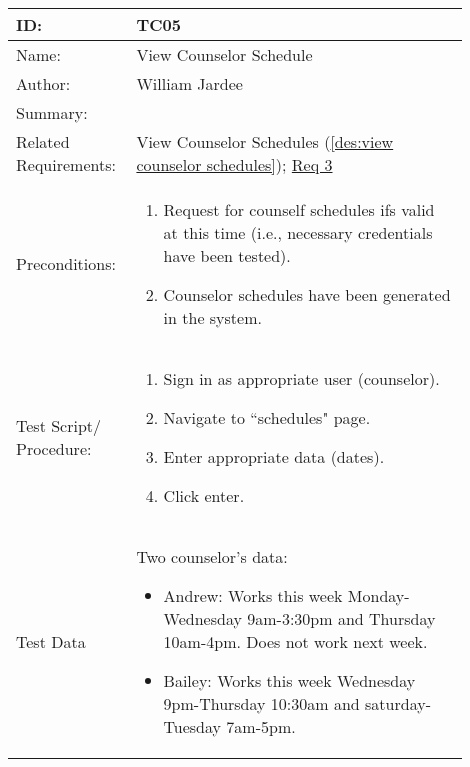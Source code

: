 \documentclass[11pt]{article}
\begin{document}
\begin{table}[H]
\begin{center}
\begin{tabular}{p{0.20\linewidth}p{0.70\linewidth}}
	ID: & TC05\\\hline
	Name: & View Counselor Schedule \\\hline
	Author: & William Jardee\\\hline
	Summary: &  \\\hline
	Related \hspace{5em} Requirements:& View Counselor Schedules (\cref{des:view counselor schedules}); \hyperlink{Req3}{Req 3}\\\hline
	Preconditions:& \begin{enumerate}[topsep=0pt]
		\item Request for counself schedules ifs valid at this time (i.e., necessary credentials have been tested).
		\item Counselor schedules have been generated in the system. 
	\end{enumerate}\\\hline
	Test Script/ Procedure: & \begin{enumerate}[topsep=0pt]
		\item Sign in as appropriate user (counselor).
		\item Navigate to ``schedules" page.
		\item Enter appropriate data (dates).
		\item Click enter.
	\end{enumerate}\\\hline
	Test Data & \vspace*{.25em} Two counselor's data:
	\begin{itemize}[topsep=0pt]
		\item Andrew: Works this week Monday-Wednesday 9am-3:30pm and Thursday 10am-4pm. Does not work next week.
		\item Bailey: Works this week Wednesday 9pm-Thursday 10:30am and saturday-Tuesday 7am-5pm.
	\end{itemize}
\end{tabular}
\label{TC05}	
\end{center}
\end{table}
\end{document}
